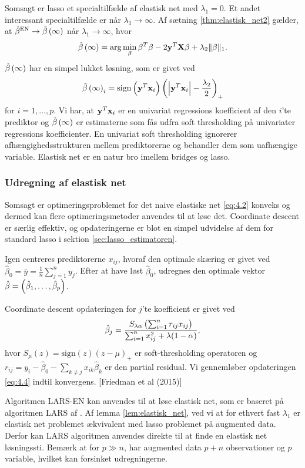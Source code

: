 Somsagt er lasso et specialtilfælde af elastisk net med \(\lambda_1=0\). 
Et andet interessant specialtilfælde er når \(\lambda_1 \rightarrow \infty\).
Af sætning \ref{thm:elastisk_net2} gælder, at \(\hat{\beta}^\text{EN} \rightarrow \hat{\beta} \del{\infty}\) når \(\lambda_1 \rightarrow \infty\), hvor
\begin{align*}
\hat{\beta} \del{\infty} = \arg \min_\beta \beta^T \beta - 2 \y^T \X \beta + \lambda_2 \Vert \beta \Vert_1.
\end{align*}
\(\hat{\beta} \del{\infty}\) har en simpel lukket løsning, som er givet ved
\begin{align*}
\hat{\beta} \del{\infty}_i = \text{sign} \del{\y^T \mathbf{x}_i} \del{\left\vert \y^T \mathbf{x}_i \right\vert - \frac{\lambda_2}{2}}_+
\end{align*}
for \(i = 1, \ldots, p\).
Vi har, at \(\mathbf{y}^T \mathbf{x}_i\) er en univariat regressions koefficient af den \(i\)'te prediktor og \(\hat{\beta} \del{\infty}\) er estimaterne som fås udfra soft thresholding på univariater regressions koefficienter.
En univariat soft thresholding ignorerer afhængighedsstrukturen mellem prediktorerne og behandler dem som uafhængige variable.
Elastisk net er en natur bro imellem bridges og lasso.

\subsubsection{Udregning af elastisk net}
Somsagt er optimeringsproblemet for det naive elastiske net \eqref{eq:4.2} konveks og dermed kan flere optimeringsmetoder anvendes til at løse det.
Coordinate descent er særlig effektiv, og opdateringerne er blot en simpel udvidelse af dem for standard lasso i sektion \ref{sec:lasso_estimatoren}.

Igen centreres prediktorerne \(x_{ij}\), hvoraf den optimale skæring er givet ved \(\hat{\beta}_0=\bar{y}=\frac{1}{n} \sum_{j=1}^n y_j\).
Efter at have løst \(\hat{\beta}_0\), udregnes den optimale vektor \(\hat{\beta}= \del{\hat{\beta}_1, \ldots, \hat{\beta}_p}\).

Coordinate descent opdateringen for $j$'te koefficient er givet ved
\begin{align}
\hat{\beta}_j = \frac{S_{\lambda \alpha} \del{\sum_{i=1}^n r_{ij} x_{ij}}}{\sum_{i=1}^n x_{ij}^2 + \lambda (1-\alpha)}, \label{eq:4.4}
\end{align} 
hvor $S_\mu(z)=\text{sign}(z)(z-\mu)_+$ er soft-thresholding operatoren og $r_{ij}=y_i - \hat{\beta}_0 - \sum_{k \neq j} x_{ik} \hat{\beta}_k$ er den partial residual.
Vi gennemløber opdateringen \eqref{eq:4.4} indtil konvergens.
[Friedman et al (2015)]

Algoritmen LARS-EN kan anvendes til at løse elastisk net, som er baseret på algoritmen LARS af \cite{efron}.
Af lemma \ref{lem:elastisk_net}, ved vi at for ethvert fast \(\lambda_1\) er elastisk net problemet ækvivalent med lasso problemet på augmented data.
Derfor kan LARS algoritmen anvendes direkte til at finde en elastisk net løsningssti.
Bemærk at for \(p \gg n\), har augmented data \(p+n\) observationer og \(p\) variable, hvilket kan forsinket udregningerne.



\newpage
